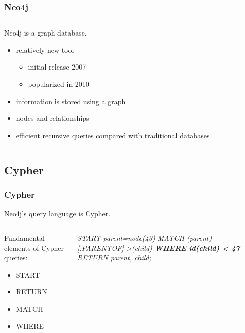 \documentclass{beamer}
\begin{document}
\begin{frame}
	\frametitle{Neo4j}
	
	
	
\begin{columns} 
\begin{column}{0.60 \textwidth}
Neo4j is a graph database.
		\begin{itemize}
		\item relatively new tool
			\begin{itemize}
			\item initial release 2007
			\item popularized in 2010
			\end{itemize}
		\item information is stored using a graph
		\item nodes and relationships
		\item efficient recursive queries compared with traditional databases
		\end{itemize}
		\end{column}
		\begin{column}{0.40\textwidth}
       \\
  \end{column}
  \end{columns}

\end{frame}

\subsection{Cypher}

\begin{frame}
	\frametitle{Cypher}
	Neo4j's query language is Cypher.
	\begin{columns}
	\begin{column}{0.40\textwidth}

	Fundamental elements of Cypher queries:
		\begin{itemize}
		\item START
		\item RETURN
		\item MATCH
		\item WHERE
		\end{itemize}
	\end{column}
	\begin{column}{0.60\textwidth}

	\emph{
START parent=node(43)
\linebreak
MATCH (parent)-[:PARENTOF]->(child)
\linebreak
\textbf{WHERE id(child) < 47}
\linebreak
RETURN parent, child;
}

	\end{column}	
	\end{columns}
\end{frame}
\end{document}

